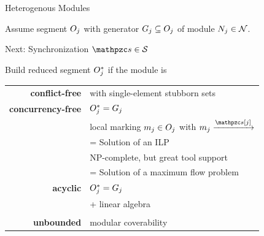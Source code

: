 \documentclass[11pt]{presentation}
\begin{document}
\begin{frame}{Heterogenous Modules}

	Assume segment $ \segment[j] $ with generator $ \generator[j] \subseteq \segment[j] $ of module $ \module{j} \in \modules $.

	\medskip
	Next: Synchronization $ \synchronization \in \synchronizations $

	\medskip
	Build reduced segment $ \segment[j]^* $ if the module is

	\medskip
	\begin{tabular}{r p{8cm}}
		\textbf{conflict-free}    & with single-element stubborn sets                                                                              \\
		\textbf{concurrency-free} & $ \segment[j]^* = \generator[j]$                                                                               \\
		                          & local marking $ \localmarking{j} \in \segment[j] $ with $ \localmarking{j} \xrightarrow{\synchronization[j]} $ \\
		                          &
		= Solution of an ILP                                                                                                                       \\
		                          & NP-complete, but great tool support \smiley                                                                    \\
		                          & = Solution of a maximum flow problem       \cite{wallner2024state}                                             \\

		\textbf{acyclic}
		                          & $ \segment[j]^* = \generator[j]$                                                                               \\
		                          & + linear algebra \cite{schultz2024utilization}                                                                 \\
		                          &                                                                                                                \\
		\textbf{unbounded}        & modular coverability \cite{wallner2026coverability}
	\end{tabular}

\end{frame}
\end{document}
